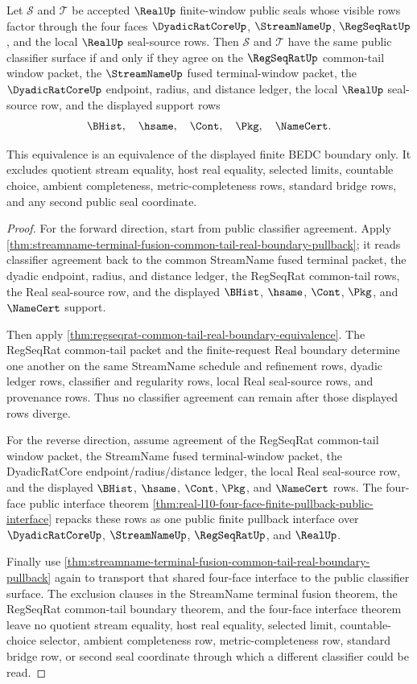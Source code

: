 \begin{theorem}
\label{thm:real-common-tail-terminal-four-face-classifier-equivalence}
Let $\mathcal S$ and $\mathcal T$ be accepted $\RealUp$ finite-window public seals whose visible rows factor through the four faces $\DyadicRatCoreUp$, $\StreamNameUp$, $\RegSeqRatUp$, and the local $\RealUp$ seal-source rows. Then $\mathcal S$ and $\mathcal T$ have the same public classifier surface if and only if they agree on the $\RegSeqRatUp$ common-tail window packet, the $\StreamNameUp$ fused terminal-window packet, the $\DyadicRatCoreUp$ endpoint, radius, and distance ledger, the local $\RealUp$ seal-source row, and the displayed support rows
$$
\BHist,\quad \hsame,\quad \Cont,\quad \Pkg,\quad \NameCert.
$$

This equivalence is an equivalence of the displayed finite BEDC boundary only. It excludes quotient stream equality, host real equality, selected limits, countable choice, ambient completeness, metric-completeness rows, standard bridge rows, and any second public seal coordinate.
\end{theorem}
\begin{proof}
For the forward direction, start from public classifier agreement. Apply \autoref{thm:streamname-terminal-fusion-common-tail-real-boundary-pullback}; it reads classifier agreement back to the common StreamName fused terminal packet, the dyadic endpoint, radius, and distance ledger, the RegSeqRat common-tail rows, the Real seal-source row, and the displayed $\BHist$, $\hsame$, $\Cont$, $\Pkg$, and $\NameCert$ support.

Then apply \autoref{thm:regseqrat-common-tail-real-boundary-equivalence}. The RegSeqRat common-tail packet and the finite-request Real boundary determine one another on the same StreamName schedule and refinement rows, dyadic ledger rows, classifier and regularity rows, local Real seal-source rows, and provenance rows. Thus no classifier agreement can remain after those displayed rows diverge.

For the reverse direction, assume agreement of the RegSeqRat common-tail window packet, the StreamName fused terminal-window packet, the DyadicRatCore endpoint/radius/distance ledger, the local Real seal-source row, and the displayed $\BHist$, $\hsame$, $\Cont$, $\Pkg$, and $\NameCert$ rows. The four-face public interface theorem \autoref{thm:real-l10-four-face-finite-pullback-public-interface} repacks these rows as one public finite pullback interface over $\DyadicRatCoreUp$, $\StreamNameUp$, $\RegSeqRatUp$, and $\RealUp$.

Finally use \autoref{thm:streamname-terminal-fusion-common-tail-real-boundary-pullback} again to transport that shared four-face interface to the public classifier surface. The exclusion clauses in the StreamName terminal fusion theorem, the RegSeqRat common-tail boundary theorem, and the four-face interface theorem leave no quotient stream equality, host real equality, selected limit, countable-choice selector, ambient completeness row, metric-completeness row, standard bridge row, or second seal coordinate through which a different classifier could be read.
\end{proof}

